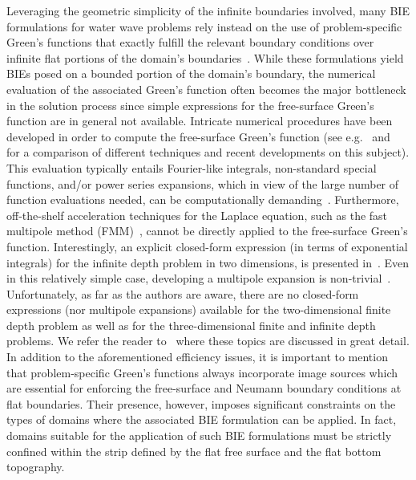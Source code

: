 \documentclass[review,hidelinks,onefignum,onetabnum]{siamart220329}
\begin{document}
Leveraging the geometric simplicity of the infinite boundaries involved, many BIE formulations for water wave problems rely instead on the use of problem-specific Green's functions that exactly fulfill the relevant boundary conditions over infinite flat portions of the domain's boundaries~\cite{angell1991recent,angell1986integral,black1975wave,chakrabarti2001application,fenton1978wave,mackay2021green}. While these formulations yield BIEs posed on a bounded portion of the domain's boundary, the numerical evaluation of the associated Green's function often becomes the major bottleneck in the solution process since simple expressions for the free-surface Green's function are in general not available. Intricate numerical procedures have been developed in order to compute the free-surface Green's function (see e.g.~\cite{xie2018comparison} and~\cite{mackay2021green} for a comparison of  different techniques and recent developments on this subject). This evaluation typically entails  Fourier-like integrals, non-standard special functions, and/or power series expansions, which in view of the large number of function evaluations needed, can be computationally demanding~\cite{newman1985algorithms}. Furthermore, off-the-shelf acceleration techniques for the Laplace equation, such as the fast multipole method (FMM)~\cite{greengard1987fast}, cannot be directly applied to the free-surface Green's function. Interestingly, an explicit closed-form expression (in terms of exponential integrals) for the infinite depth problem in two dimensions, is presented in~\cite{hein2010explicit}. Even in this relatively simple case, developing a multipole expansion is non-trivial~\cite{perez2012fast}. Unfortunately, as far as the authors are aware, there are no closed-form expressions (nor multipole expansions) available for the two-dimensional finite depth problem as well as for the three-dimensional finite and infinite depth problems. We refer the reader to~\cite{martin2006multiple,hoernig2010green,linton2001mathematical} where these topics are discussed in great detail. In addition to the aforementioned efficiency issues, it is important to mention that problem-specific Green's functions always incorporate image sources which are essential for enforcing the free-surface and Neumann boundary conditions at flat boundaries. Their presence, however, imposes significant constraints on the types of domains where the associated BIE formulation can be applied. In fact, domains suitable for the application of such BIE formulations must be strictly confined within the strip defined by the flat free surface and the flat bottom topography.
\end{document}
